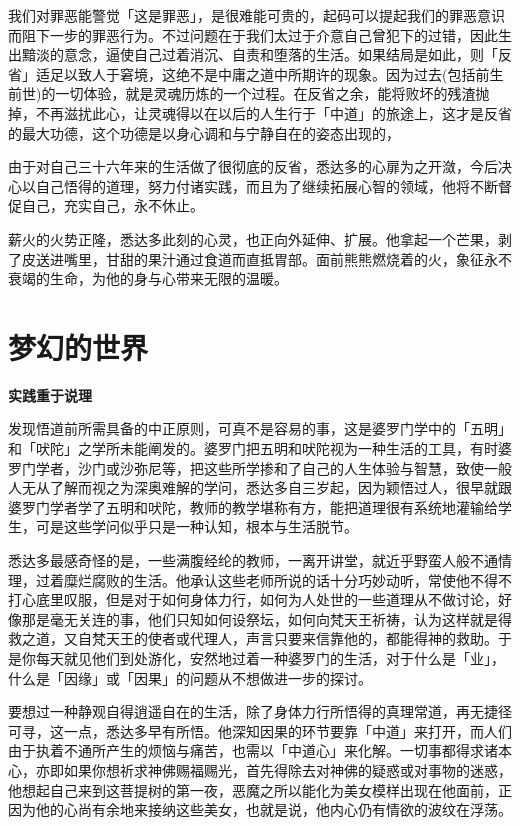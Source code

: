 \documentclass[twoside,openany]{book}
\newcommand{\mt}[1]{\textbullet \textbf{#1}}
\begin{document}
我们对罪恶能警觉「这是罪恶」，是很难能可贵的，起码可以提起我们的罪恶意识而阻下一步的罪恶行为。不过问题在于我们太过于介意自己曾犯下的过错，因此生出黯淡的意念，逼使自己过着消沉、自责和堕落的生活。如果结局是如此，则「反省」适足以致人于窘境，这绝不是中庸之道中所期许的现象。因为过去(包括前生前世)的一切体验，就是灵魂历炼的一个过程。在反省之余，能将败坏的残渣抛掉，不再滋扰此心，让灵魂得以在以后的人生行于「中道」的旅途上，这才是反省的最大功德，这个功德是以身心调和与宁静自在的姿态出现的，



由于对自己三十六年来的生活做了很彻底的反省，悉达多的心扉为之开潋，今后决心以自己悟得的道理，努力付诸实践，而且为了继续拓展心智的领域，他将不断督促自己，充实自己，永不休止。

薪火的火势正隆，悉达多此刻的心灵，也正向外延伸、扩展。他拿起一个芒果，剥了皮送进嘴里，甘甜的果汁通过食道而直抵胃部。面前熊熊燃烧着的火，象征永不衰竭的生命，为他的身与心带来无限的温暖。

\section{梦幻的世界}\label{sec1.14}

\mt{实践重于说理}

发现悟道前所需具备的中正原则，可真不是容易的事，这是婆罗门学中的「五明」和「吠陀」之学所未能阐发的。婆罗门把五明和吠陀视为一种生活的工具，有时婆罗门学者，沙门或沙弥尼等，把这些所学掺和了自己的人生体验与智慧，致使一般人无从了解而视之为深奥难解的学问，悉达多自三岁起，因为颖悟过人，很早就跟婆罗门学者学了五明和吠陀，教师的教学堪称有方，能把道理很有系统地灌输给学生，可是这些学问似乎只是一种认知，根本与生活脱节。

悉达多最感奇怪的是，一些满腹经纶的教师，一离开讲堂，就近乎野蛮人般不通情理，过着糜烂腐败的生活。他承认这些老师所说的话十分巧妙动听，常使他不得不打心底里叹服，但是对于如何身体力行，如何为人处世的一些道理从不做讨论，好像那是毫无关连的事，他们只知如何设祭坛，如何向梵天王祈祷，认为这样就是得救之道，又自梵天王的使者或代理人，声言只要来信靠他的，都能得神的救助。于是你每天就见他们到处游化，安然地过着一种婆罗门的生活，对于什么是「业」，什么是「因缘」或「因果」的问题从不想做进一步的探讨。

要想过一种静观自得逍遥自在的生活，除了身体力行所悟得的真理常道，再无捷径可寻，这一点，悉达多早有所悟。他深知因果的环节要靠「中道」来打开，而人们由于执着不通所产生的烦恼与痛苦，也需以「中道心」来化解。一切事都得求诸本心，亦即如果你想祈求神佛赐福赐光，首先得除去对神佛的疑惑或对事物的迷惑，他想起自己来到这菩提树的第一夜，恶魔之所以能化为美女模样出现在他面前，正因为他的心尚有余地来接纳这些美女，也就是说，他内心仍有情欲的波纹在浮荡。
\end{document}
